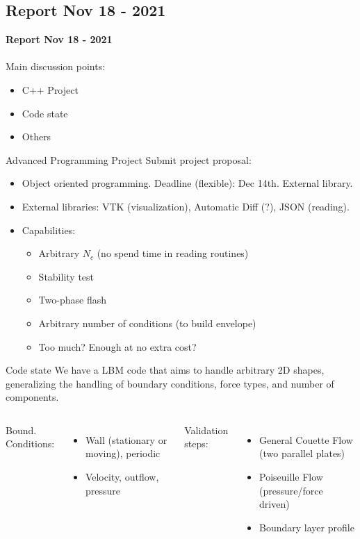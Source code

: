 \documentclass{beamer}
\begin{document}
	\subsection{Report Nov 18 - 2021}
	\justifying
	\begin{frame}
		\textbf{Report Nov 18 - 2021}\\~\\
		Main discussion points:
		\begin{itemize}
			\item C++ Project
			\item Code state
			\item Others
		\end{itemize}
	\end{frame}
	\begin{frame}{Advanced Programming Project}
		Submit project proposal:
		\begin{itemize}
			\item Object oriented programming. Deadline (flexible): Dec 14th. External library.
			\item External libraries: VTK (visualization), Automatic Diff (?), JSON (reading). 
			\item Capabilities:
			\begin{itemize}
				\item Arbitrary $N_c$ (no spend time in reading routines)
				\item Stability test
				\item Two-phase flash
				\item Arbitrary number of conditions (to build envelope)
				\item Too much? Enough at no extra cost?
			\end{itemize}
		\end{itemize}
	\end{frame}
	
	\begin{frame}{Code state}
		We have a LBM code that aims to handle arbitrary 2D shapes, generalizing the handling of boundary conditions, force types, and number of components.\\
		\begin{columns}
			Bound. Conditions:
			\begin{itemize}
				\item Wall (stationary or moving), periodic
				\item \alert{Velocity, outflow, pressure}
			\end{itemize}
			
			Validation steps:
			\begin{itemize}
				\item General Couette Flow (two parallel plates)
				\item Poiseuille Flow (pressure/force driven)
				\item Boundary layer profile
			\end{itemize}
		\end{columns}
	\end{frame}
\end{document}
